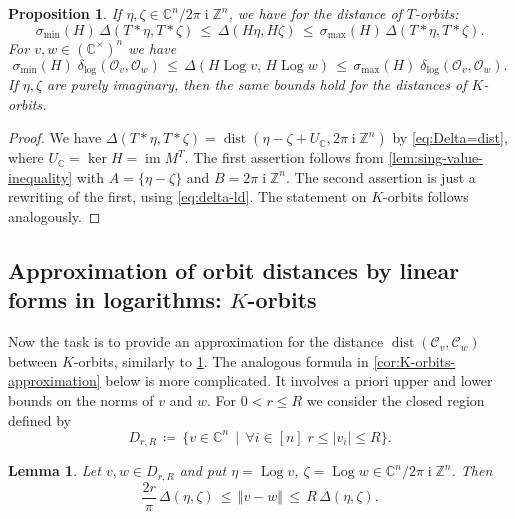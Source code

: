 \documentclass[10pt,a4paper]{article}
\newtheorem{lemma}[theorem]{Lemma}
\newtheorem{proposition}[theorem]{Proposition}
\theoremstyle{definition}
\DeclareMathOperator{\ii}{i}
\DeclareMathOperator{\Log}{Log}
\DeclareMathOperator{\dist}{dist}
\newcommand{\distLD}{\delta_{\log}}
\DeclareMathOperator{\ran}{im}
\newcommand{\CC}{\mathbb{C}}
\newcommand{\ZZ}{\mathbb{Z}}
\newcommand{\OO}{\ensuremath{\mathcal{O}}}
\newcommand{\KK}{\ensuremath{\mathcal{C}}}
\numberwithin{equation}{section}
\begin{document}
\begin{proposition}\label{cor:delta-ld-linear-forms} %
If $\eta,\zeta\in\CC^n/2\pi\ii\ZZ^n$, we have for the distance of $T$-orbits:
\[
\sigma_{\min}(H)\, \Delta(T\ast\eta,T\ast\zeta) \,\leq\, \Delta(H\eta,H\zeta)
   \,\leq\, \sigma_{\max}(H) \, \Delta(T\ast\eta,T\ast\zeta).
\]
For $v,w\in(\CC^\times)^n$ we have
\[
 \sigma_{\min}(H)\; \distLD(\OO_v, \OO_w) \,\leq\, \Delta(H\Log v,\, H\Log w)\,\leq\,
  \sigma_{\max}(H)\; \distLD(\OO_v, \OO_w).
\]
If $\eta,\zeta$ are purely imaginary, then the same bounds hold for the distances of $K$-orbits.
\end{proposition}

\begin{proof}
We have
$\Delta(T\ast\eta,T\ast \zeta) = \dist( \eta-\zeta + U_\CC , 2\pi\ii\ZZ^n)$
by \cref{eq:Delta=dist},
where $U_\CC=\ker H =\ran M^T$.
The first assertion follows from \cref{lem:sing-value-inequality}
with $A =\{\eta-\zeta\}$ and $B=2\pi\ii\ZZ^n$.
The second assertion is just a rewriting of the first, using \cref{eq:delta-ld}.
The statement on $K$-orbits follows analogously.
\end{proof}


\subsection{Approximation of orbit distances by linear forms in logarithms: \texorpdfstring{$K$}{K}-orbits}
Now the task is to provide an approximation
for the distance $\dist(\KK_v,\KK_w)$ between $K$-orbits,
similarly to \cref{cor:delta-ld-linear-forms}.
The analogous formula in \cref{cor:K-orbits-approximation} below is more complicated.
It involves a priori upper and lower bounds on the norms of $v$ and $w$.
For $0<r\leq R$ we consider the closed region defined by
\begin{equation}\label{eq:DrR}
 D_{r, R} \,\coloneqq\, \{ v\in\CC^n \, \mid\, \forall i\in [n]\; r \leq |v_i|\leq R \}.
\end{equation}

\begin{lemma}
\label{lem:delta-dist}
Let $v,w\in D_{r, R}$ and put $\eta = \Log v$, $\zeta = \Log w\in\CC^n/2\pi\ii\ZZ^n$. Then
\[
 \frac{2r}{\pi}\, \Delta(\eta,\zeta) \, \leq \, \Vert v-w\Vert\, \leq \, R\, \Delta(\eta,\zeta).
\]
\end{lemma}
\end{document}
